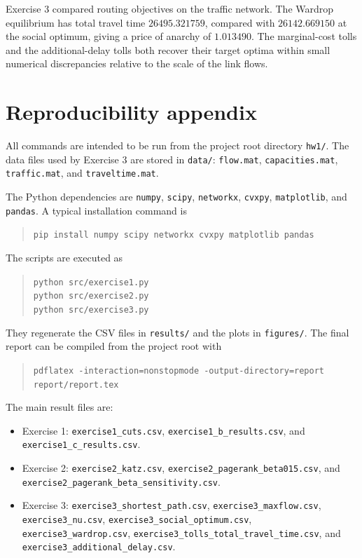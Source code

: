 \documentclass[11pt,a4paper]{article}
\begin{document}
Exercise 3 compared routing objectives on the traffic network. The Wardrop
equilibrium has total travel time \(26495.321759\), compared with
\(26142.669150\) at the social optimum, giving a price of anarchy of
\(1.013490\). The marginal-cost tolls and the additional-delay tolls both
recover their target optima within small numerical discrepancies relative to
the scale of the link flows.

\appendix
\section{Reproducibility appendix}

All commands are intended to be run from the project root directory
\texttt{hw1/}. The data files used by Exercise 3 are stored in
\texttt{data/}: \texttt{flow.mat}, \texttt{capacities.mat},
\texttt{traffic.mat}, and \texttt{traveltime.mat}.

The Python dependencies are \texttt{numpy}, \texttt{scipy},
\texttt{networkx}, \texttt{cvxpy}, \texttt{matplotlib}, and
\texttt{pandas}. A typical installation command is
\begin{quote}
\texttt{pip install numpy scipy networkx cvxpy matplotlib pandas}
\end{quote}

The scripts are executed as
\begin{quote}
\texttt{python src/exercise1.py}\\
\texttt{python src/exercise2.py}\\
\texttt{python src/exercise3.py}
\end{quote}
They regenerate the CSV files in \texttt{results/} and the plots in
\texttt{figures/}. The final report can be compiled from the project root with
\begin{quote}
\texttt{pdflatex -interaction=nonstopmode -output-directory=report report/report.tex}
\end{quote}

The main result files are:
\begin{itemize}
\item Exercise 1: \texttt{exercise1\_cuts.csv},
\texttt{exercise1\_b\_results.csv}, and
\texttt{exercise1\_c\_results.csv}.
\item Exercise 2: \texttt{exercise2\_katz.csv},
\texttt{exercise2\_pagerank\_beta015.csv}, and
\texttt{exercise2\_pagerank\_beta\_sensitivity.csv}.
\item Exercise 3: \texttt{exercise3\_shortest\_path.csv},
\texttt{exercise3\_maxflow.csv}, \texttt{exercise3\_nu.csv},
\texttt{exercise3\_social\_optimum.csv}, \texttt{exercise3\_wardrop.csv},
\texttt{exercise3\_tolls\_total\_travel\_time.csv}, and
\texttt{exercise3\_additional\_delay.csv}.
\end{itemize}
\end{document}
